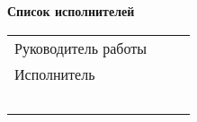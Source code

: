  

\newpage

\textbf{Список исполнителей}
\\[20mm]


  \begin{tabular}{p{150pt}p{100pt}p{100pt}} 
       Руководитель работы & &~ \\ [15pt]
       Исполнитель & &  \\ [25pt]
         & &~ \\ [15pt]

     
       
        
        
    \end{tabular}
